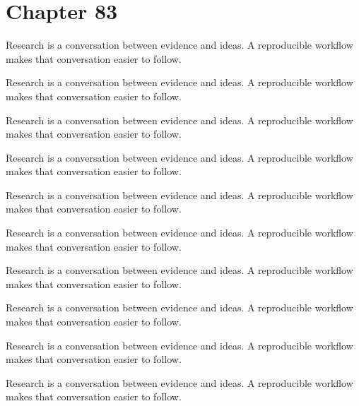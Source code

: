 \section*{Chapter 83}
Research is a conversation between evidence and ideas. A reproducible workflow makes that conversation easier to follow.

Research is a conversation between evidence and ideas. A reproducible workflow makes that conversation easier to follow.

Research is a conversation between evidence and ideas. A reproducible workflow makes that conversation easier to follow.

Research is a conversation between evidence and ideas. A reproducible workflow makes that conversation easier to follow.

Research is a conversation between evidence and ideas. A reproducible workflow makes that conversation easier to follow.

Research is a conversation between evidence and ideas. A reproducible workflow makes that conversation easier to follow.

Research is a conversation between evidence and ideas. A reproducible workflow makes that conversation easier to follow.

Research is a conversation between evidence and ideas. A reproducible workflow makes that conversation easier to follow.

Research is a conversation between evidence and ideas. A reproducible workflow makes that conversation easier to follow.

Research is a conversation between evidence and ideas. A reproducible workflow makes that conversation easier to follow.

\newpage
